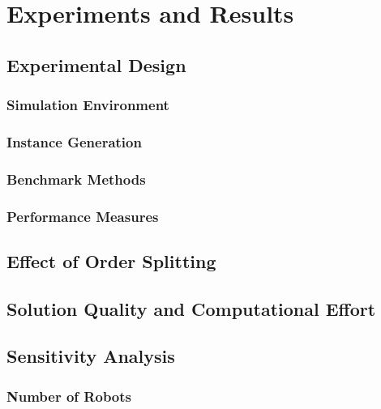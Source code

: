 %
%
%

\chapter{Experiments and Results}
\label{ch:exp}

\section{Experimental Design}
\label{sec:exp-design}

\subsection{Simulation Environment}
\label{sec:exp-environment}

\subsection{Instance Generation}
\label{sec:exp-instances}

\subsection{Benchmark Methods}
\label{sec:exp-benchmarks}

\subsection{Performance Measures}
\label{sec:exp-measures}

\section{Effect of Order Splitting}
\label{sec:exp-split}

\section{Solution Quality and Computational Effort}
\label{sec:exp-quality}

\section{Sensitivity Analysis}
\label{sec:exp-sensitivity}

\subsection{Number of Robots}
\label{sec:exp-robots}

